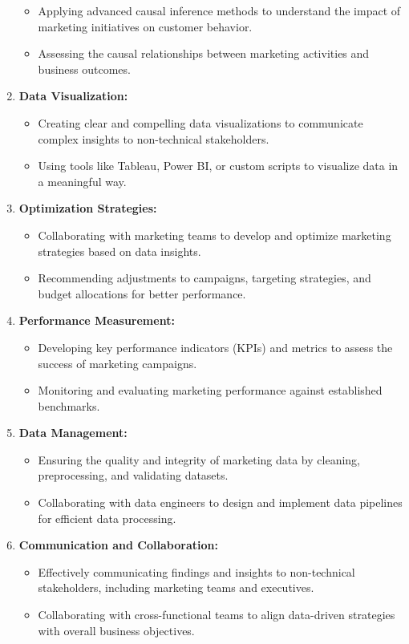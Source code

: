\documentclass[
]{book}
\providecommand{\tightlist}{%
  \setlength{\itemsep}{0pt}\setlength{\parskip}{0pt}}
\begin{document}
\begin{enumerate}
  \begin{itemize}
  \tightlist
  \item
    Applying advanced causal inference methods to understand the impact of marketing initiatives on customer behavior.
  \item
    Assessing the causal relationships between marketing activities and business outcomes.
  \end{itemize}
\item
  \textbf{Data Visualization:}

  \begin{itemize}
  \tightlist
  \item
    Creating clear and compelling data visualizations to communicate complex insights to non-technical stakeholders.
  \item
    Using tools like Tableau, Power BI, or custom scripts to visualize data in a meaningful way.
  \end{itemize}
\item
  \textbf{Optimization Strategies:}

  \begin{itemize}
  \tightlist
  \item
    Collaborating with marketing teams to develop and optimize marketing strategies based on data insights.
  \item
    Recommending adjustments to campaigns, targeting strategies, and budget allocations for better performance.
  \end{itemize}
\item
  \textbf{Performance Measurement:}

  \begin{itemize}
  \tightlist
  \item
    Developing key performance indicators (KPIs) and metrics to assess the success of marketing campaigns.
  \item
    Monitoring and evaluating marketing performance against established benchmarks.
  \end{itemize}
\item
  \textbf{Data Management:}

  \begin{itemize}
  \tightlist
  \item
    Ensuring the quality and integrity of marketing data by cleaning, preprocessing, and validating datasets.
  \item
    Collaborating with data engineers to design and implement data pipelines for efficient data processing.
  \end{itemize}
\item
  \textbf{Communication and Collaboration:}

  \begin{itemize}
  \tightlist
  \item
    Effectively communicating findings and insights to non-technical stakeholders, including marketing teams and executives.
  \item
    Collaborating with cross-functional teams to align data-driven strategies with overall business objectives.
  \end{itemize}
\end{enumerate}
\end{document}
